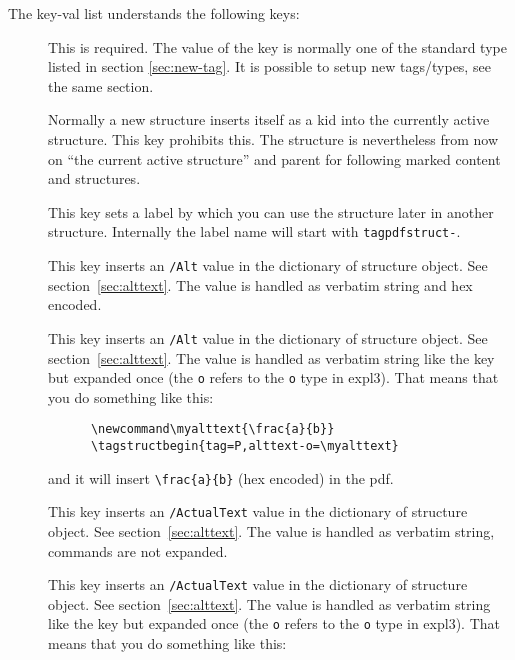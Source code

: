 \documentclass[DIV=12,parskip=half-,bibliography=totoc]{scrartcl}
\begin{document}
The key-val list understands the following keys:
\begin{description}
  \item[] This is required. The value of the key is normally one of the standard type listed in section \ref{sec:new-tag}. It is possible to setup new tags/types, see the same section.
  \item[] Normally a new structure inserts itself as a kid into the currently active structure. This key prohibits this. The structure is nevertheless from now on \enquote{the current active structure} and parent for following  marked content and structures.
  \item[] This key sets a label by which you can use the structure later in another structure. Internally the label name will start with \texttt{tagpdfstruct-}.
  \item[] This key inserts an \texttt{/Alt} value in the dictionary of structure object. See section~\ref{sec:alttext}. The value is handled as verbatim string and hex encoded.

  \item[] This key inserts an \texttt{/Alt} value in the dictionary of structure object. See section~\ref{sec:alttext}. The value is handled as verbatim string like the key  but expanded once (the \texttt{o} refers to the \texttt{o} type in expl3). That means that you do something like this:

      \begin{lstlisting}
      \newcommand\myalttext{\frac{a}{b}}
      \tagstructbegin{tag=P,alttext-o=\myalttext}
      \end{lstlisting}

      and it will insert \verb+\frac{a}{b}+  (hex encoded) in the pdf.

  \item[] This key inserts an \texttt{/ActualText} value in the dictionary of structure object. See section~\ref{sec:alttext}. The value is handled as verbatim string, commands are not expanded.

  \item[] This key inserts an \texttt{/ActualText} value in the dictionary of structure object. See section~\ref{sec:alttext}. The value is handled as verbatim string like the key  but expanded once (the \texttt{o} refers to the \texttt{o} type in expl3). That means that you do something like this:


\end{description}
\end{document}

